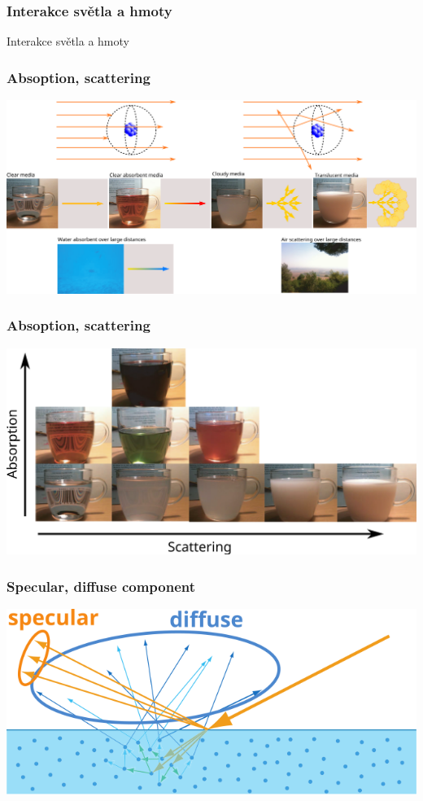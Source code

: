 \begin{frame}
\frametitle{Interakce světla a hmoty}
\begin{center}
\Huge {\color{white}Interakce světla a hmoty}
\end{center}
\end{frame}

\begin{frame}
    \frametitle{Absoption, scattering}
    \includegraphics[width=\textwidth]{pics/physicallyBasedRendering/scattering_absorption2/scattering_absorption}
\end{frame}

\begin{frame}
    \frametitle{Absoption, scattering}
    \includegraphics[width=\textwidth]{pics/physicallyBasedRendering/scattering_absorption1/scattering_absorption}
\end{frame}

\begin{frame}
    \frametitle{Specular, diffuse component}
    \includegraphics[width=\textwidth]{pics/physicallyBasedRendering/specular_diffuse}
\end{frame}

